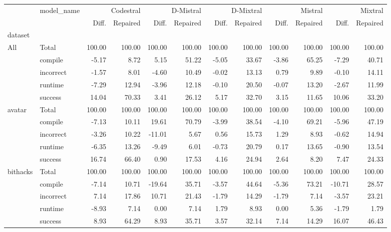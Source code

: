 \begin{tabular}{llrrrrrrrrrr}
\toprule
 & model_name & \multicolumn{2}{r}{Codestral} & \multicolumn{2}{r}{D-Mistral} & \multicolumn{2}{r}{D-Mixtral} & \multicolumn{2}{r}{Mistral} & \multicolumn{2}{r}{Mixtral} \\
 &  & Diff. & Repaired & Diff. & Repaired & Diff. & Repaired & Diff. & Repaired & Diff. & Repaired \\
dataset &  &  &  &  &  &  &  &  &  &  &  \\
\midrule
\multirow[t]{5}{*}{All} & Total & 100.00 & 100.00 & 100.00 & 100.00 & 100.00 & 100.00 & 100.00 & 100.00 & 100.00 & 100.00 \\
 & compile & -5.17 & 8.72 & 5.15 & 51.22 & -5.05 & 33.67 & -3.86 & 65.25 & -7.29 & 40.71 \\
 & incorrect & -1.57 & 8.01 & -4.60 & 10.49 & -0.02 & 13.13 & 0.79 & 9.89 & -0.10 & 14.11 \\
 & runtime & -7.29 & 12.94 & -3.96 & 12.18 & -0.10 & 20.50 & -0.07 & 13.20 & -2.67 & 11.99 \\
 & success & 14.04 & 70.33 & 3.41 & 26.12 & 5.17 & 32.70 & 3.15 & 11.65 & 10.06 & 33.20 \\
\cline{1-12}
\multirow[t]{5}{*}{avatar} & Total & 100.00 & 100.00 & 100.00 & 100.00 & 100.00 & 100.00 & 100.00 & 100.00 & 100.00 & 100.00 \\
 & compile & -7.13 & 10.11 & 19.61 & 70.79 & -3.99 & 38.54 & -4.10 & 69.21 & -5.96 & 47.19 \\
 & incorrect & -3.26 & 10.22 & -11.01 & 5.67 & 0.56 & 15.73 & 1.29 & 8.93 & -0.62 & 14.94 \\
 & runtime & -6.35 & 13.26 & -9.49 & 6.01 & -0.73 & 20.79 & 0.17 & 13.65 & -0.90 & 13.54 \\
 & success & 16.74 & 66.40 & 0.90 & 17.53 & 4.16 & 24.94 & 2.64 & 8.20 & 7.47 & 24.33 \\
\cline{1-12}
\multirow[t]{5}{*}{bithacks} & Total & 100.00 & 100.00 & 100.00 & 100.00 & 100.00 & 100.00 & 100.00 & 100.00 & 100.00 & 100.00 \\
 & compile & -7.14 & 10.71 & -19.64 & 35.71 & -3.57 & 44.64 & -5.36 & 73.21 & -10.71 & 28.57 \\
 & incorrect & 7.14 & 17.86 & 10.71 & 21.43 & -1.79 & 14.29 & -1.79 & 7.14 & -3.57 & 23.21 \\
 & runtime & -8.93 & 7.14 & 0.00 & 7.14 & 1.79 & 8.93 & 0.00 & 5.36 & -1.79 & 1.79 \\
 & success & 8.93 & 64.29 & 8.93 & 35.71 & 3.57 & 32.14 & 7.14 & 14.29 & 16.07 & 46.43 \\

\end{tabular}
